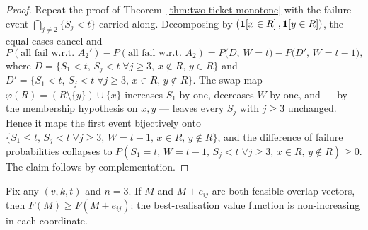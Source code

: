 \begin{proof}
  Repeat the proof of Theorem~\ref{thm:two-ticket-monotone} with the
  failure event $\bigcap_{j \ne 2}\{S_j < t\}$ carried along.
  Decomposing by $(\mathbf{1}\!\left[x \in R\right], \mathbf{1}\!\left[y \in R\right])$, the equal cases cancel
  and
  \[
    P(\text{all fail w.r.t.\ } A_2') - P(\text{all fail w.r.t.\ } A_2)
    = P\bigl(D,\, W = t\bigr) - P\bigl(D',\, W = t-1\bigr),
  \]
  where $D = \{S_1 < t,\, S_j < t \;\forall j \ge 3,\, x \notin R,\,
  y \in R\}$ and $D' = \{S_1 < t,\, S_j < t \;\forall j \ge 3,\,
  x \in R,\, y \notin R\}$.  The swap map
  $\varphi(R) = (R \setminus \{y\}) \cup \{x\}$ increases $S_1$ by one,
  decreases $W$ by one, and --- by the membership hypothesis on $x, y$ ---
  leaves every $S_j$ with $j \ge 3$ unchanged.  Hence it maps the first
  event bijectively onto $\{S_1 \le t,\, S_j < t \;\forall j \ge 3,\,
  W = t-1,\, x \in R,\, y \notin R\}$, and the difference of failure
  probabilities collapses to
  $P(S_1 = t,\, W = t-1,\, S_j < t \;\forall j \ge 3,\, x \in R,\,
  y \notin R) \ge 0$.  The claim follows by complementation.
\end{proof}

\begin{theorem}
  \label{thm:profile-monotone}
  Fix any $(v,k,t)$ and $n = 3$.  If $M$ and $M + e_{ij}$ are both
  feasible overlap vectors, then $F(M) \ge F(M + e_{ij})$: the
  best-realisation value function is non-increasing in each coordinate.
\end{theorem}


